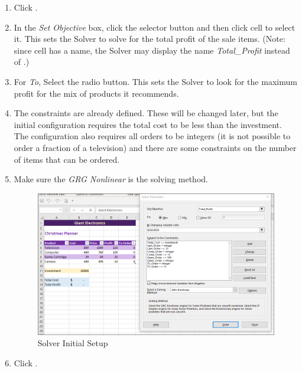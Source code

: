 \begin{enumbox}
	\begin{enumerate}
		\item Click .
		\item In the \textit{Set Objective} box, click the selector button and then click cell  to select it. This sets the Solver to solve for the total profit of the sale items. (Note: since cell  has a name, the Solver may display 	the name \textit{Total\_Profit} instead of .)
		\item For \textit{To}, Select the  radio button. This sets the Solver to look for the maximum profit for the mix of products it recommends.
		\item The constraints are already defined. These will be changed later, but the initial configuration requires the total cost to be less than the investment. The configuration also requires all orders to be integers (it is not possible to order a fraction of a television) and there are some constraints on the number of items that can be ordered.
		\item Make sure the \textit{GRG Nonlinear} is the solving method.

		\begin{figure}[H]
			\centering
			\includegraphics[width=\maxwidth{.95\linewidth}]{gfx/ch08_fig81}
			\caption{Solver Initial Setup}
			\label{08:fig81}
		\end{figure}

		\item Click .
	\end{enumerate}
\end{enumbox}

